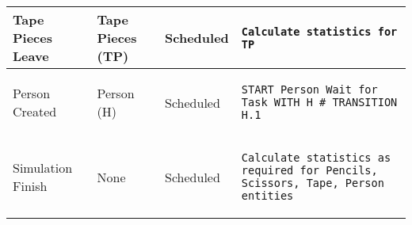 \begin{longtable}{@{}>{\raggedright\arraybackslash}p{1.5cm}>{\raggedright\arraybackslash}p{2.1cm}>{\raggedright\arraybackslash}p{2.2cm}>{\raggedright\arraybackslash}p{10cm}@{}}
  \\ \midrule
Tape Pieces Leave & Tape Pieces (TP)  & Scheduled  & 
  \begin{lstlisting}[language=CMPseudo]
Calculate statistics for TP
  \end{lstlisting}
  \\ \midrule
  Person Created & Person (H)  & Scheduled  & 
  \begin{lstlisting}[language=CMPseudo]
START Person Wait for Task WITH H # TRANSITION H.1
  \end{lstlisting}
  \\ \midrule
  Simulation Finish & None  & Scheduled  & 
  \begin{lstlisting}[language=CMPseudo]
Calculate statistics as required for Pencils, Scissors, Tape, Person entities
  \end{lstlisting}
  \\ \bottomrule
  \end{longtable}
